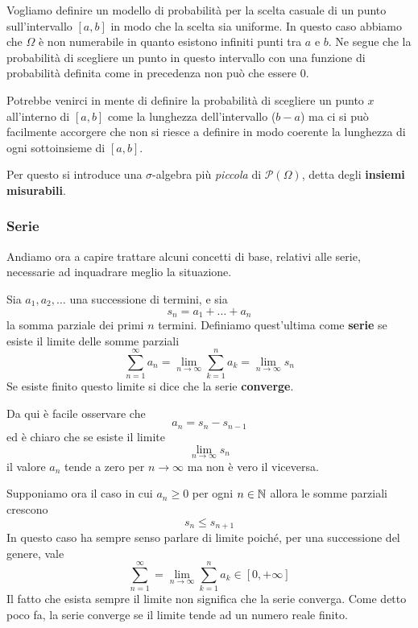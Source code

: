 \begin{example}
	Vogliamo definire un modello di probabilità per la scelta casuale di un punto sull'intervallo
	$[a,b]$ in modo che la scelta sia uniforme. In questo caso abbiamo che $\Omega$ è non
	numerabile in quanto esistono infiniti punti tra $a$ e $b$. Ne segue che la probabilità di 
	scegliere un punto in questo intervallo con una funzione di probabilità definita come in 
	precedenza non può che essere 0.

	Potrebbe venirci in mente di definire la probabilità di scegliere un punto $x$ all'interno di 
	$[a,b]$ come la lunghezza dell'intervallo ($b-a$) ma ci si può facilmente accorgere che non
	si riesce a definire in modo coerente la lunghezza di ogni sottoinsieme di $[a,b]$.

	Per questo si introduce una $\sigma$-algebra più \emph{piccola} di $\mathcal{P}(\Omega)$, 
	detta degli \textbf{insiemi misurabili}.
\end{example}

\subsubsection{Serie}
Andiamo ora a capire trattare alcuni concetti di base, relativi alle serie, necessarie ad
inquadrare meglio la situazione.

\begin{definition}
	Sia $a_1, a_2, \dots$ una successione di termini, e sia
	\[ s_n = a_1 + \dots + a_n \]
	la somma parziale dei primi $n$ termini. Definiamo quest'ultima come \textbf{serie} se esiste
	il limite delle somme parziali
	\[ \sum_{n=1}^\infty a_n = \lim_{n \to \infty} \sum_{k=1}^n a_k = \lim_{n \to \infty} s_n \]
	Se esiste finito questo limite si dice che la serie \textbf{converge}.
\end{definition}

\begin{observation}
	Da qui è facile osservare che
	\[ a_n = s_n - s_{n-1} \]
	ed è chiaro che se esiste il limite
	\[ \lim_{n \to \infty} s_n \]
	il valore $a_n$ tende a zero per $n \to \infty$ ma non è vero il viceversa.
\end{observation}

Supponiamo ora il caso in cui $a_n \geq 0$ per ogni $n \in \mathbb{N}$ allora le somme parziali crescono
\[ s_n \leq s_{n+1} \]
In questo caso ha sempre senso parlare di limite poiché, per una successione del genere, vale
\[ \sum_{n=1}^\infty = \lim_{n \to \infty} \sum_{k=1}^n a_k \in [0, +\infty]  \]
Il fatto che esista sempre il limite non significa che la serie converga. Come detto poco fa, la
serie converge se il limite tende ad un numero reale finito.

